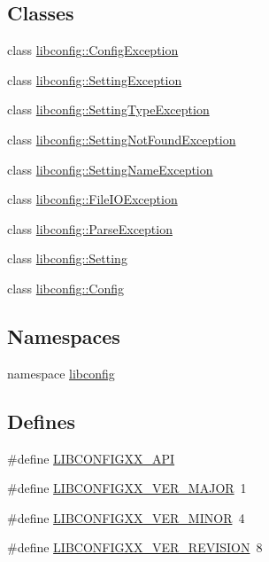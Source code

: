 \subsection*{Classes}
\begin{DoxyCompactItemize}
\item 
class \hyperlink{classlibconfig_1_1_config_exception}{libconfig::ConfigException}
\item 
class \hyperlink{classlibconfig_1_1_setting_exception}{libconfig::SettingException}
\item 
class \hyperlink{classlibconfig_1_1_setting_type_exception}{libconfig::SettingTypeException}
\item 
class \hyperlink{classlibconfig_1_1_setting_not_found_exception}{libconfig::SettingNotFoundException}
\item 
class \hyperlink{classlibconfig_1_1_setting_name_exception}{libconfig::SettingNameException}
\item 
class \hyperlink{classlibconfig_1_1_file_i_o_exception}{libconfig::FileIOException}
\item 
class \hyperlink{classlibconfig_1_1_parse_exception}{libconfig::ParseException}
\item 
class \hyperlink{classlibconfig_1_1_setting}{libconfig::Setting}
\item 
class \hyperlink{classlibconfig_1_1_config}{libconfig::Config}
\end{DoxyCompactItemize}
\subsection*{Namespaces}
\begin{DoxyCompactItemize}
\item 
namespace \hyperlink{namespacelibconfig}{libconfig}
\end{DoxyCompactItemize}
\subsection*{Defines}
\begin{DoxyCompactItemize}
\item 
\#define \hyperlink{libconfig_8h_09_09_a8664a5f8533ae4aecd48e7763f2a4839}{LIBCONFIGXX\_\-API}
\item 
\#define \hyperlink{libconfig_8h_09_09_ab687fb0e058a7fcfc86a6a05f77dd545}{LIBCONFIGXX\_\-VER\_\-MAJOR}~1
\item 
\#define \hyperlink{libconfig_8h_09_09_a9a7835a0747b2ad8db8a3081a3c85f3c}{LIBCONFIGXX\_\-VER\_\-MINOR}~4
\item 
\#define \hyperlink{libconfig_8h_09_09_a2e8b8ffb97a61e09a27ae2ec8686b50b}{LIBCONFIGXX\_\-VER\_\-REVISION}~8
\end{DoxyCompactItemize}


